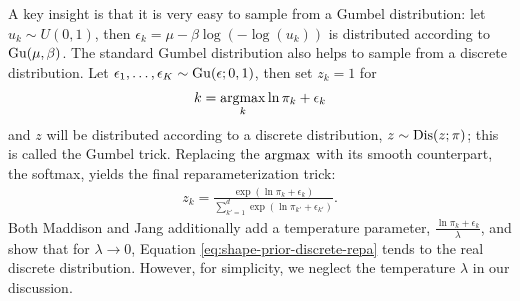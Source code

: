 A key insight is that it is very easy to sample from a Gumbel distribution:
let $u_k \sim U(0,1)$, then $\epsilon_k = \mu - \beta \log(-\log(u_k))$
is distributed according to $\mathrm{Gu}(\mu, \beta)$. The standard Gumbel
distribution also helps to sample from a discrete distribution. Let 
$\epsilon_{1},\ldots,\epsilon_{K} \sim \mathrm{Gu}(\epsilon; 0, 1)$, then set $z_k = 1$ for
\begin{align}
  k = \operatorname*{argmax}_{k} \ln \pi_k + \epsilon_{k}
  \label{eq:shape-prior-bernoulli-repa}
\end{align}
and $z$ will be distributed according to a discrete distribution, \ie $z \sim \mathrm{Dis}(z;\pi)$;
this is called the Gumbel trick.
Replacing the $\operatorname*{argmax}$ with its smooth counterpart, \ie the softmax,
yields the final reparameterization trick:
\begin{align}
  z_k = \frac{\exp(\ln \pi_k + \epsilon_k)}{\sum_{k' = 1}^d \exp(\ln \pi_{k'} + \epsilon_{k'})}.
  \label{eq:shape-prior-discrete-repa}
\end{align}
Both Maddison \etal \cite{MaddisonMnihTeh:2016} and Jang \etal \cite{JangGuPoole:2016}
additionally add a temperature parameter, \ie $\frac{\ln \pi_k + \epsilon_k}{\lambda}$,
and show that for $\lambda \rightarrow 0$, Equation \eqref{eq:shape-prior-discrete-repa}
tends to the real discrete distribution. However, for simplicity, we neglect
the temperature $\lambda$ in our discussion.

